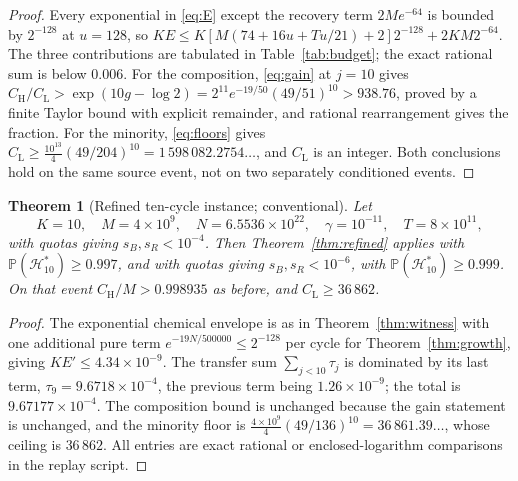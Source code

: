 \documentclass[11pt,a4paper]{article}
\theoremstyle{plain}
\newtheorem{theorem}{Theorem}[section]
\theoremstyle{definition}
\theoremstyle{remark}
\newcommand{\Prob}{\mathbb P}
\newcommand{\lo}{\mathrm L}
\newcommand{\hi}{\mathrm H}
\begin{document}
\begin{proof}
Every exponential in \eqref{eq:E} except the recovery term $2Me^{-64}$ is
bounded by $2^{-128}$ at $u=128$, so
$KE\le K[M(74+16u+Tu/21)+2]2^{-128}+2KM2^{-64}$. The three contributions are
tabulated in Table~\ref{tab:budget}; the exact rational sum is below $0.006$.
For the composition, \eqref{eq:gain} at $j=10$ gives
$C_\hi/C_\lo>\exp(10g-\log2)=2^{11}e^{-19/50}(49/51)^{10}>938.76$, proved by a
finite Taylor bound with explicit remainder, and rational rearrangement gives
the fraction. For the minority, \eqref{eq:floors} gives
$C_\lo\ge\frac{10^{13}}4(49/204)^{10}=1\,598\,082.2754\ldots$, and $C_\lo$ is an
integer. Both conclusions hold on the same source event, not on two separately
conditioned events.
\end{proof}

\begin{theorem}[Refined ten-cycle instance; conventional]\label{thm:witnessrefined}
Let
\begin{equation}\label{eq:witnessrefined}
K=10,\quad M=4\times10^{9},\quad N=6.5536\times10^{22},\quad\gamma=10^{-11},
\quad T=8\times10^{11},
\end{equation}
with quotas giving $s_B,s_R<10^{-4}$. Then Theorem~\ref{thm:refined} applies
with $\Prob(\mathcal H^*_{10})\ge0.997$, and with quotas giving
$s_B,s_R<10^{-6}$, with $\Prob(\mathcal H^*_{10})\ge0.999$. On that event
$C_\hi/M>0.998935$ as before, and $C_\lo\ge36\,862$.
\end{theorem}

\begin{proof}
The exponential chemical envelope is as in Theorem~\ref{thm:witness} with one
additional pure term $e^{-19N/500000}\le2^{-128}$ per cycle for
Theorem~\ref{thm:growth}, giving $KE'\le4.34\times10^{-9}$. The transfer sum
$\sum_{j<10}\tau_j$ is dominated by its last term, $\tau_9=9.6718\times10^{-4}$,
the previous term being $1.26\times10^{-9}$; the total is
$9.67177\times10^{-4}$. The composition bound is unchanged because the gain
statement is unchanged, and the minority floor is
$\frac{4\times10^{9}}4(49/136)^{10}=36\,861.39\ldots$, whose ceiling is
$36\,862$. All entries are exact rational or enclosed-logarithm comparisons in
the replay script.
\end{proof}
\end{document}

